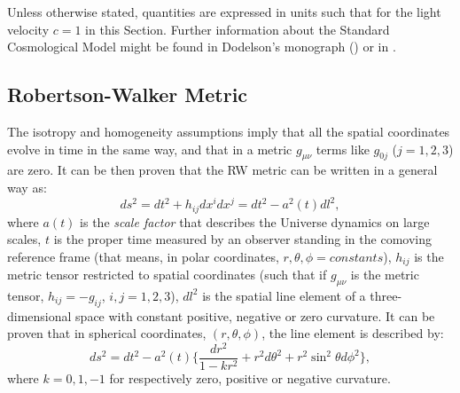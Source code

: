 Unless otherwise stated, quantities are expressed in units such that for the light velocity $c=1$ in this Section. Further information about the Standard Cosmological Model might be found in Dodelson's monograph (\citealt{dodelson}) or in \citet{kolb}.

\subsection{Robertson-Walker Metric}
The isotropy and homogeneity assumptions imply that all the spatial coordinates evolve in time in the same way, and that in a metric $g_{\mu\nu}$ terms like $g_{0 j}$ ($j= 1, 2, 3$) are zero. It can be then proven that the RW metric can be written in a general way as:
\begin{equation}
ds^{2} = dt^{2} + h_{ij}dx^{i}dx^{j} = dt^{2} - a^{2}(t)dl^{2}, \label{RW}
\end{equation}where $a(t)$ is the \emph{scale factor} that describes the Universe dynamics on large scales, $t$ is the proper time measured by an observer standing in the comoving reference frame (that means, in polar coordinates, $r,\theta,\phi = constants$), $h_{ij}$ is the metric tensor restricted to spatial coordinates (such that if $g_{\mu \nu}$ is the metric tensor, $h_{ij} = - g_{ij}$, $i, j= 1, 2, 3$), $dl^{2}$ is the spatial line element of a three-dimensional space with constant positive, negative or zero curvature.
It can be proven that in spherical coordinates, $(r, \theta, \phi)$, the line element is described by:
\begin{equation}
ds^{2} = dt^{2} - a^{2}(t) \Big \{ \frac{dr^{2}}{1-kr^2} + r^{2}d\theta^{2} + r^{2}\sin^{2}{\theta} d\phi^{2} \Big\} , \label{RW4}
\end{equation}where $k = 0, 1, -1$ for respectively zero, positive or negative curvature.%

